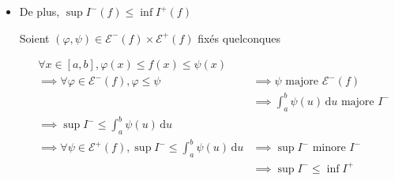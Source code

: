 \documentclass{article}
\renewenvironment{question_kholle}[2][ ]
{
	\subsection{\texorpdfstring{#2}{}}
	\notblank{#1}
	{
		\noindent #1
		\bigbreak
	}
	{}
	\begin{proof}
}
{
	\end{proof}
}
\begin{document}
\begin{question_kholle}
\begin{itemize}[label=$\lozenge$]
\begin{itemize}[label=$\star$]
                  \begin{align*}
                    \forall x \in [a, b], \varphi(x)\leqslant f(x) & \leqslant \|f\|_{\infty, [a, b]}                              \\
                    \implies \varphi                               & \leqslant \|f\|_{\infty[a, b]}                                \\
                    \implies \int_{a}^{b} \varphi(u) \, \mathrm du & \leqslant  \int_{a}^{b} \|f\|_{\infty, [a, b]}  \, \mathrm dt
                  \end{align*}
          \end{itemize}

          On procède de la même manière pour la borne inf de $I^{+}(f)$

    \item De plus, $\sup I^{-}(f) \leqslant \inf I^{+}(f)$

          Soient $(\varphi, \psi) \in \mathcal{E}^{-}(f)\times \mathcal{E}^{+}(f)$ fixés quelconques


          \begin{align*}
             & \forall x \in [a, b], \varphi(x) \leqslant f(x) \leqslant \psi(x)                                                                                                           \\
             & \implies \forall \varphi \in \mathcal{E}^{-}(f), \varphi \leqslant \psi                                & \implies \psi \text{ majore } \mathcal{E}^{-}(f)                   \\
             &                                                                                                        & \implies \int_{a}^{b} \psi(u) \, \mathrm du  \text{ majore } I^{-} \\
             & \implies \sup I^{-} \leqslant \int_{a}^{b} \psi(u) \, \mathrm du                                                                                                            \\
             & \implies \forall \psi \in \mathcal{E}^{+}(f), \sup I^{-} \leqslant \int_{a}^{b} \psi(u)  \, \mathrm du & \implies \sup I^{-} \text{ minore } I^{-}                          \\
             &                                                                                                        & \implies \sup I^{-} \leqslant \inf I^{+}
          \end{align*}



\end{itemize}
\end{question_kholle}
\end{document}
